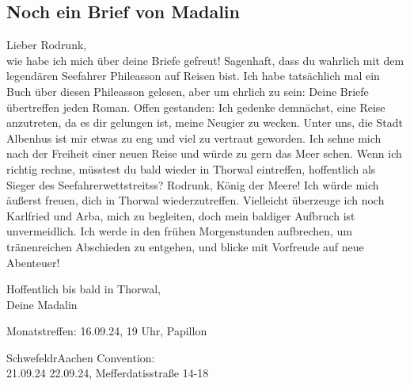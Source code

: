 \documentclass[final]{multiversum}
\begin{document}
\subsection{Noch ein Brief von Madalin}
Lieber Rodrunk,\\
wie habe ich mich über deine Briefe gefreut! Sagenhaft, dass du wahrlich mit dem
legendären Seefahrer Phileasson auf Reisen bist. Ich habe tatsächlich mal ein
Buch über diesen Phileasson gelesen, aber um ehrlich zu sein: Deine Briefe
übertreffen jeden Roman.  Offen gestanden: Ich gedenke demnächst, eine Reise
anzutreten, da es dir gelungen ist, meine Neugier zu wecken. Unter uns, die
Stadt Albenhus ist mir etwas zu eng und viel zu vertraut geworden. Ich sehne
mich nach der Freiheit einer neuen Reise und würde zu gern das Meer sehen. Wenn
ich richtig rechne, müsstest du bald wieder in Thorwal eintreffen, hoffentlich
als Sieger des Seefahrerwettstreitss? Rodrunk, König der Meere! Ich würde mich
äußerst freuen, dich in Thorwal wiederzutreffen. Vielleicht überzeuge ich noch
Karlfried und Arba, mich zu begleiten, doch mein baldiger Aufbruch ist
unvermeidlich.  Ich werde in den frühen Morgenstunden aufbrechen, um
tränenreichen Abschieden zu entgehen, und blicke mit Vorfreude auf neue
Abenteuer!

\noindent Hoffentlich bis bald in Thorwal,\\
Deine Madalin
\begin{termine}
  \item Monatstreffen: 16.09.24, 19 Uhr, Papillon
  \item SchwefeldrAachen Convention: \\21.09.24 \textendash{} 22.09.24, 
        Mefferdatisstraße 14-18
\end{termine}
\impressum
\end{document}
